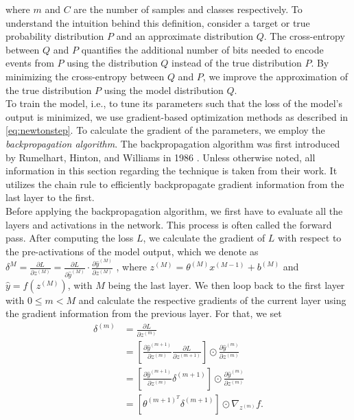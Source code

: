 where $m$ and $C$ are the number of samples and classes respectively.
To understand the intuition behind this definition, consider a target or true probability distribution \(P\) and an approximate distribution \(Q\).
The cross-entropy between \(Q\) and \(P\) quantifies the additional number of bits needed to encode events from \(P\) using the distribution \(Q\) instead of the true distribution \(P\).
By minimizing the cross-entropy between \(Q\) and \(P\), we improve the approximation of the true distribution \(P\) using the model distribution \(Q\).\cite{bishop2006pattern}\\
To train the model, i.e., to tune its parameters such that the loss of the model's output is minimized,
we use gradient-based optimization methods as described in \ref{eq:newtonstep}.
To calculate the gradient of the parameters, we employ the \emph{backpropagation algorithm}.
The backpropagation algorithm was first introduced by Rumelhart, Hinton, and Williams in 1986 \cite{rumelhart1986learning}.
Unless otherwise noted, all information in this section regarding the technique is taken from their work.
It utilizes the chain rule to efficiently backpropagate gradient information from the last layer to the first.\\
Before applying the backpropagation algorithm, we first have to evaluate all the layers and activations in the network.
This process is often called the forward pass.
After computing the loss \(L\), we calculate the gradient of \(L\) with respect to the pre-activations of the model output, which we denote as
$\delta^{M} = \frac{\partial L}{\partial z^{(M)}} = \frac{\partial L}{\partial \hat{y}^{(M)}} \cdot \frac{\partial \hat{y}^{(M)}}{\partial z^{(M)}}$
, where \(z^{(M)} = \theta^{(M)} x^{(M-1)} + b^{(M)}\) and \(\hat{y} = f(z^{(M)})\), with \(M\) being the last layer.
We then loop back to the first layer with \(0 \leq m < M\) and calculate the respective gradients of the current layer using the gradient information from the previous layer. For that, we set
\begin{align}
    \delta^{(m)} &= \frac{\partial L}{\partial z^{(m)}} \\
                 &= \left[  \frac{\partial \hat{y}^{(m+1)}}{\partial z^{(m)}} \frac{\partial L}{\partial z^{(m+1)}} \right] \odot \frac{\partial \hat{y}^{(m)}}{\partial z^{(m)}} \\
                 &= \left[ \frac{\partial \hat{y}^{(m+1)}}{\partial z^{(m)}}  \delta^{(m+1)} \right] \odot \frac{\partial \hat{y}^{(m)}}{\partial z^{(m)}} \\
                 &= \left[ \theta^{(m+1)^T} \delta^{(m+1)}  \right] \odot \nabla_{z^{(m)}} f.
\end{align}

